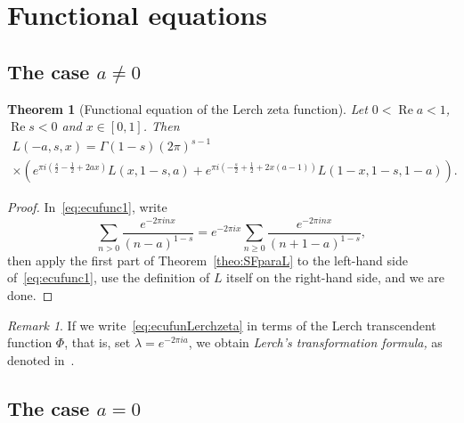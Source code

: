 \documentclass[11pt,a4paper,reqno]{amsart}
\renewcommand{\Re}{\operatorname{Re}}
\theoremstyle{plain}
\newtheorem{theorem}{Theorem}%
\theoremstyle{remark}
\newtheorem{remark}{Remark}
\numberwithin{equation}{section}
\begin{document}
\section{Functional equations}
\label{sec:funequation}

\subsection{The case \texorpdfstring{$a\not=0$}{a!=0}}

\begin{theorem}[Functional equation of the Lerch zeta function]
\label{theo:ecufuncional}
Let $0 < \Re a < 1$,
$\Re s<0$ and $x\in[0,1]$. Then
\begin{multline}
\label{eq:ecufunLerchzeta}
  L(-a,s,x) = \Gamma(1-s)(2\pi)^{s-1}
  \\
  \times \left(e^{\pi i(\frac{s}{2}-\frac12+2ax)}L(x,1-s,a)
  + e^{\pi i(-\frac{s}{2} + \frac12+2x(a-1))} L(1-x,1-s,1-a) \right).
\end{multline}
\end{theorem}

\begin{proof}
In~\eqref{eq:ecufunc1}, write
\begin{equation*}
  \sum_{n> 0} \frac{e^{-2\pi inx}}{(n-a)^{1-s}}
  = e^{-2\pi ix} \sum_{n\geq 0} \frac{e^{-2\pi inx}}{(n+1-a)^{1-s}},
\end{equation*}
then apply the first part of Theorem~\ref{theo:SFparaL} to the left-hand side of~\eqref{eq:ecufunc1}, use the definition of $L$ itself on the right-hand side, and we are done.
\end{proof}


\begin{remark}
If we write~\eqref{eq:ecufunLerchzeta} in terms of the Lerch transcendent function $\Phi$, that is, set $\lambda=e^{-2\pi i a}$, we obtain \emph{Lerch's transformation formula,} as denoted in~\cite[Eq.~(7), p.~29]{Bate}.
\end{remark}


\subsection{The case \texorpdfstring{$a=0$}{a=0}}
\end{document}
